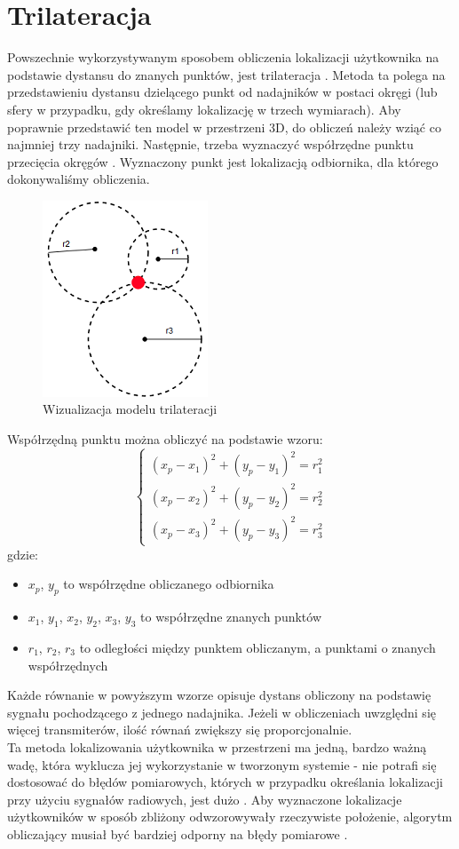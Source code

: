 \section{Trilateracja}
Powszechnie wykorzystywanym sposobem obliczenia lokalizacji użytkownika na podstawie dystansu do znanych punktów, jest trilateracja \cite{MS}. Metoda ta polega na przedstawieniu dystansu dzielącego punkt od nadajników w postaci okręgi (lub sfery w przypadku, gdy określamy lokalizację w trzech wymiarach). Aby poprawnie przedstawić ten model w przestrzeni 3D, do obliczeń należy wziąć co najmniej trzy nadajniki. Następnie, trzeba wyznaczyć współrzędne punktu przecięcia okręgów \cite{MS}. Wyznaczony punkt jest lokalizacją odbiornika, dla którego dokonywaliśmy obliczenia.
\begin{figure}[H]			
	\centering
	\caption{Wizualizacja modelu trilateracji}
	\includegraphics{trilateracja}
\end{figure}
Współrzędną punktu można obliczyć na podstawie wzoru:
\begin{equation}
\left\{
\begin{array}{l}
(x_p-x_1)^2 + (y_p - y_1)^2 = r_1^2\\
(x_p-x_2)^2 + (y_p - y_2)^2 = r_2^2\\
(x_p-x_3)^2 + (y_p - y_3)^2 = r_3^2
\end{array}
\right.
\end{equation}
gdzie:
\begin{itemize}
	\item $x_p$, $y_p$ to współrzędne obliczanego odbiornika
	\item $x_1$, $y_1$, $x_2$, $y_2$, $x_3$, $y_3$ to współrzędne znanych punktów
	\item $r_1$, $r_2$, $r_3$ to odległości między punktem obliczanym, a punktami o znanych współrzędnych
\end{itemize}
Każde równanie w powyższym wzorze opisuje dystans obliczony na podstawię sygnału pochodzącego z jednego nadajnika. Jeżeli w obliczeniach uwzględni się więcej transmiterów, ilość równań zwiększy się proporcjonalnie.\\
Ta metoda lokalizowania użytkownika w przestrzeni ma jedną, bardzo ważną wadę, która wyklucza jej wykorzystanie w tworzonym systemie - nie potrafi się dostosować do błędów pomiarowych, których w przypadku określania lokalizacji przy użyciu sygnałów radiowych, jest dużo \cite{FHSA}. Aby wyznaczone lokalizacje użytkowników w sposób zbliżony odwzorowywały rzeczywiste położenie, algorytm obliczający musiał być bardziej odporny na błędy pomiarowe \cite{MT}.
